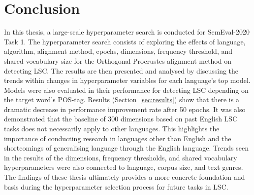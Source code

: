 \section{Conclusion}

In this thesis, a large-scale hyperparameter search is conducted for SemEval-2020 Task 1. The hyperparameter search consists of exploring the effects of language, algorithm, alignment method, epochs, dimensions, frequency threshold, and shared vocabulary size for the Orthogonal Procrustes alignment method on detecting LSC. The results are then presented and analysed by discussing the trends within changes in hyperparameter variables for each language's top model. Models were also evaluated in their performance for detecting LSC depending on the target word's POS-tag. Results (Section~\ref{sec:results}) show that there is a dramatic decrease in performance improvement rate after 50 epochs. It was also demonstrated that the baseline of 300 dimensions based on past English LSC tasks does not necessarily apply to other languages. This highlights the importance of conducting research in languages other than English and the shortcomings of generalising language through the English language. Trends seen in the results of the dimensions, frequency thresholds, and shared vocabulary hyperparameters were also connected to language, corpus size, and text genres. The findings of these thesis ultimately provides a more concrete foundation and basis during the hyperparameter selection process for future tasks in LSC. 